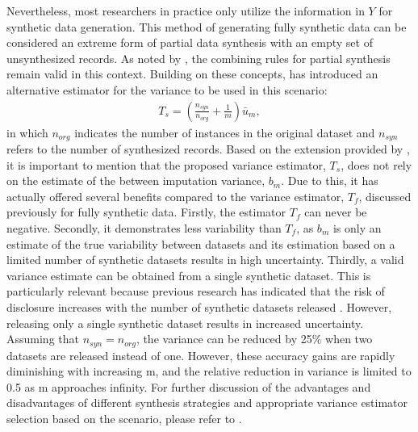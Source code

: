 Nevertheless, most researchers in practice only utilize the information in $Y$ for synthetic data generation. This method of generating fully synthetic data can be considered an extreme form of partial data synthesis with an empty set of unsynthesized records. As noted by \citet{drechsler2011improved}, the combining rules for partial synthesis remain valid in this context. Building on these concepts, \citet{raab2016practical} has introduced an alternative estimator for the variance to be used in this scenario:
\begin{align*}
    T_{s}=\left ( \frac{n_{syn}}{n_{org}}+\frac{1}{m} \right )\bar{u}_m,
\end{align*}
in which $n_{org}$ indicates the number of instances in the original dataset and $n_{syn}$ refers to the number of synthesized records. Based on the extension provided by \citet{raab2016practical}, it is important to mention that the proposed variance estimator, $T_s$, does not rely on the estimate of the between imputation variance, $b_m$. Due to this, it has actually offered several benefits compared to the variance estimator, $T_f$, discussed previously for fully synthetic data. Firstly, the estimator $T_f$ can never be negative. Secondly, it demonstrates less variability than $T_f$, as $b_m$ is only an estimate of the true variability between datasets and its estimation based on a limited number of synthetic datasets results in high uncertainty. Thirdly, a valid variance estimate can be obtained from a single synthetic dataset. This is particularly relevant because previous research has indicated that the risk of disclosure increases with the number of synthetic datasets released \citep{drechsler2009disclosure,reiter2010releasing}. However, releasing only a single synthetic dataset results in increased uncertainty. Assuming that $n_{syn} = n_{org}$, the variance can be reduced by 25\% when two datasets are released instead of one. However, these accuracy gains are rapidly diminishing with increasing m, and the relative reduction in variance is limited to 0.5 as m approaches infinity. For further discussion of the advantages and disadvantages of different synthesis strategies and appropriate variance estimator selection based on the scenario, please refer to \citet{drechsler2018some}.




